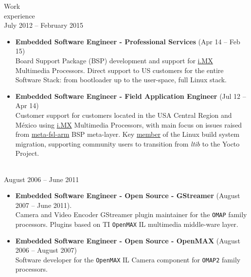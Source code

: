 \documentclass{resume}
\def\fsl{Freescale Semiconductor}
\def\texasins{Texas Instruments}
\def\dextra{Dextra Technologies}
\begin{document}
\begin{category}{Work \\experience}
  \citem{\fsl}\\
  July 2012 -- February 2015

  \begin{itemize}
  \item \textbf{Embedded Software Engineer - Professional Services} (Apr 14 -- Feb 15)\\
    Board Support Package (BSP) development and support for
    \href{https://www.nxp.com/products/processors-and-microcontrollers/arm-processors/i-mx-applications-processors:IMX_HOME}{i.MX}
    Multimedia Processors. Direct support to US customers for the entire Software Stack: from bootloader up to the user-space, full Linux
    stack.
  \end{itemize}

  \begin{itemize}
  \item \textbf{Embedded Software Engineer - Field Application Engineer} (Jul 12 -- Apr 14)\\
    Customer support for customers located in the USA Central Region and M\'exico using
    \href{https://www.nxp.com/products/processors-and-microcontrollers/arm-processors/i-mx-applications-processors:IMX_HOME}{i.MX}
    Multimedia Processors, with main focus on issues raised from \href{https://git.yoctoproject.org/cgit/cgit.cgi/meta-fsl-arm}{meta-fsl-arm} BSP meta-layer.
    Key \href{https://community.nxp.com/t5/user/viewprofilepage/user-id/25586}{member}
    of the Linux build system migration, supporting community users to transition from \textit{ltib} to the Yocto Project.
  \end{itemize}

  \citem{\texasins - \dextra}\\
  August 2006 -- June 2011

  \begin{itemize}
  \item \textbf{Embedded Software Engineer - Open Source - GStreamer} (August 2007 -- June 2011).\\
    Camera and Video Encoder GStreamer plugin maintainer for the \texttt{OMAP} family
    processors. Plugins based on TI \texttt{OpenMAX} IL multimedia middle-ware layer.
  \end{itemize}

  \begin{itemize}
  \item \textbf{Embedded Software Engineer - Open Source - OpenMAX} (August 2006 -- August 2007)\\
    Software developer for the \texttt{OpenMAX} IL Camera component for
    \texttt{OMAP2} family processors.
  \end{itemize}
  
\end{category}
\end{document}
